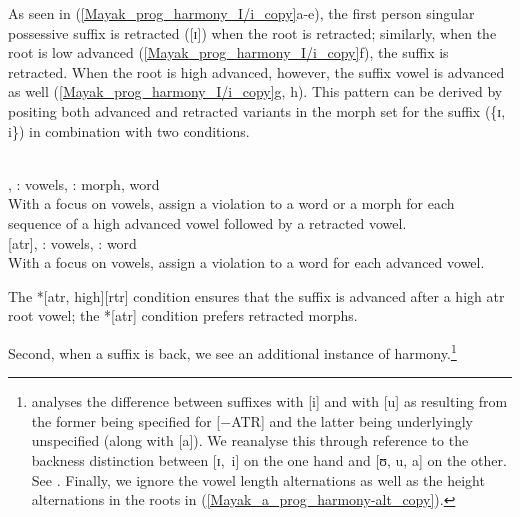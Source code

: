 As seen in (\ref{Mayak_prog_harmony_I/i_copy}a-e), the first person singular possessive suffix is retracted ([ɪ]) when the root is retracted; similarly, when the root is low advanced (\ref{Mayak_prog_harmony_I/i_copy}f), the suffix is retracted. When the root is high advanced, however, the suffix vowel is advanced as well (\ref{Mayak_prog_harmony_I/i_copy}g, h). This pattern can be derived by positing both advanced and retracted variants in the morph set for the suffix (\{ɪ, i\}) in combination with two conditions.

\begin{example}
\label{Mayak_phonotactics_1}\label{Mayak_high-atr-rtr_phonotactic}\smallskip\\
\Mahr,  \tier: vowels, \dom: morph, word\\
With a focus on vowels, assign a violation to a word or a morph for each sequence of a high advanced vowel followed by a retracted vowel.
\ex{}\label{Mayak_atr_type_copied}\smallskip\\
\relax {*}[atr], \tier: vowels, \dom: word\\
With a focus on vowels, assign a violation to a word for each  advanced vowel.
\end{example}

The *[atr, high][rtr] condition ensures that the suffix is advanced after a high atr root vowel; the *[atr] condition prefers  retracted morphs.

Second, when a suffix is back, we see an additional instance of harmony.\footnote{\citet{Andersen:1999-Vs} analyses the difference between suffixes with [i] and with [u] as resulting from the former being specified for [$-$ATR] and the latter being underlyingly unspecified (along with [a]). We reanalyse this through reference to the backness distinction between [ɪ,~i] on the one hand and [ʊ, u, a] on the other. See \citet{Ozburn:2019}. Finally, we ignore the vowel length alternations as well as the height alternations in the roots in (\ref{Mayak_a_prog_harmony-alt_copy}).}

